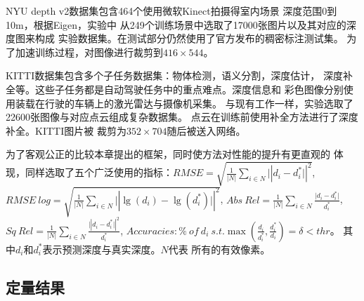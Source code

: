 NYU depth v2数据集包含464个使用微软Kinect拍摄得室内场景
深度范围0到10m，根据Eigen\cite{eigen2014depth}，实验中
从249个训练场景中选取了17000张图片以及其对应的深度图来构成
实验数据集。在测试部分仍然使用了官方发布的稠密标注测试集。
为了加速训练过程，对图像进行裁剪到$416 \times 544$。

KITTI数据集包含多个子任务数据集：物体检测，语义分割，深度估计，
深度补全等。这些子任务都是自动驾驶任务中的重点难点。深度信息和
彩色图像分别使用装载在行驶的车辆上的激光雷达与摄像机采集。
与现有工作一样，实验选取了22600张图像与对应点云组成复杂数据集。
点云在训练前使用补全方法进行了深度补全。KITTI图片被
裁剪为$352 \times 704$随后被送入网络。

为了客观公正的比较本章提出的框架，同时使方法对性能的提升有更直观的
体现，同样选取了五个广泛使用的指标\cite{eigen2014depth}：$
 RMSE=\sqrt{\frac{1}{\lvert N \rvert} \sum\nolimits_{i\in N}\lvert|d_i - d_i^*\rvert|^2} 
$,
$
  RMSE \ log = \sqrt{\frac{1}{\lvert N \rvert}\sum\nolimits_{i\in N}\lvert| \lg(d_i) - \lg(d_i^*) \rvert|^2}
$,
$
  Abs \ Rel=\frac{1}{\lvert N \rvert}\sum\nolimits_{i \in N}\frac{\lvert d_i - d_i^* \rvert}{d_i^*}
$,
$
  Sq \ Rel=\frac{1}{\lvert N \rvert}\sum\nolimits_{i \in N}\frac{\lvert| d_i - d_i^* \rvert|^2}{d_i^*}
$,
$
  Accuracies:\% \ of \ d_i \ s.t. \max(\frac{d_i}{d_i^*},\frac{d_i^*}{d_i})=\delta < thr 
$。
其中$d_i$和$d_i^*$表示预测深度与真实深度。$N$代表
所有的有效像素。 
\subsection{定量结果}


